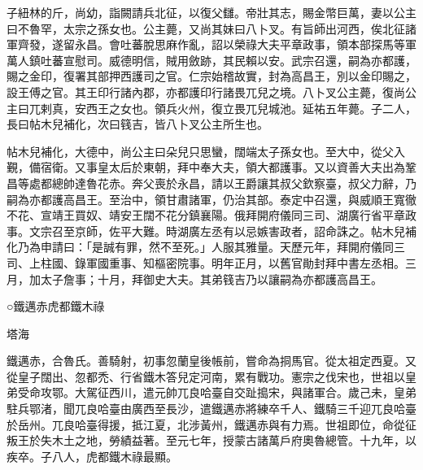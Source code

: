 \begin{pinyinscope}
 子紐林的斤，尚幼，詣闕請兵北征，以復父讎。帝壯其志，賜金幣巨萬，妻以公主曰不魯罕，太宗之孫女也。公主薨，又尚其妹曰八卜叉。有旨師出河西，俟北征諸軍齊發，遂留永昌。會吐蕃脫思麻作亂，詔以榮祿大夫平章政事，領本部探馬等軍萬人鎮吐蕃宣慰司。威德明信，賊用斂跡，其民賴以安。武宗召還，嗣為亦都護，賜之金印，復署其部押西護司之官。仁宗始稽故實，封為高昌王，別以金印賜之，設王傅之官。其王印行諸內郡，亦都護印行諸畏兀兒之境。八卜叉公主薨，復尚公主曰兀剌真，安西王之女也。領兵火州，復立畏兀兒城池。延祐五年薨。子二人，長曰帖木兒補化，次曰篯吉，皆八卜叉公主所生也。



 帖木兒補化，大德中，尚公主曰朵兒只思蠻，闊端太子孫女也。至大中，從父入覲，備宿衛。又事皇太后於東朝，拜中奉大夫，領大都護事。又以資善大夫出為鞏昌等處都總帥達魯花赤。奔父喪於永昌，請以王爵讓其叔父欽察臺，叔父力辭，乃嗣為亦都護高昌王。至治中，領甘肅諸軍，仍治其部。泰定中召還，與威順王寬徹不花、宣靖王買奴、靖安王闊不花分鎮襄陽。俄拜開府儀同三司、湖廣行省平章政事。文宗召至京師，佐平大難。時湖廣左丞有以忌嫉害政者，詔命誅之。帖木兒補化乃為申請曰：「是誠有罪，然不至死。」人服其雅量。天歷元年，拜開府儀同三司、上柱國、錄軍國重事、知樞密院事。明年正月，以舊官勛封拜中書左丞相。三月，加太子詹事；十月，拜御史大夫。其弟篯吉乃以讓嗣為亦都護高昌王。



 ○鐵邁赤虎都鐵木祿



 塔海



 鐵邁赤，合魯氏。善騎射，初事忽蘭皇後帳前，嘗命為挏馬官。從太祖定西夏。又從皇子闊出、忽都禿、行省鐵木答兒定河南，累有戰功。憲宗之伐宋也，世祖以皇弟受命攻鄂。大駕征西川，遣元帥兀良哈臺自交趾搗宋，與諸軍合。歲己未，皇弟駐兵鄂渚，聞兀良哈臺由廣西至長沙，遣鐵邁赤將練卒千人、鐵騎三千迎兀良哈臺於岳州。兀良哈臺得援，抵江夏，北涉黃州，鐵邁赤與有力焉。世祖即位，命從征叛王於失木土之地，勞績益著。至元七年，授蒙古諸萬戶府奧魯總管。十九年，以疾卒。子八人，虎都鐵木祿最顯。




\end{pinyinscope}
